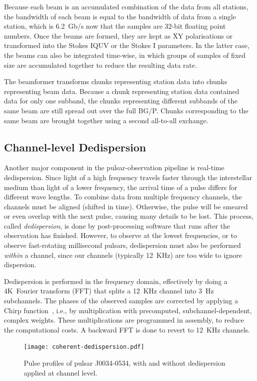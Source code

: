 \documentclass{llncs}
\begin{document}
Because each beam is an accumulated combination of the data from all stations, the bandwidth of each beam is equal to the bandwidth of data from a single station, which is 6.2~Gb/s now that the samples are 32-bit floating point numbers. Once the beams are formed, they are kept as XY polarisations or transformed into the Stokes IQUV or the Stokes I parameters. In the latter case, the beams can also be integrated time-wise, in which groups of samples of fixed size are accumulated together to reduce the resulting data rate.

The beamformer transforms chunks representing station data into chunks representing beam data. Because a chunk representing station data contained data for only one subband, the chunks representing different subbands of the same beam are still spread out over the full BG/P. Chunks corresponding to the same beam are brought together using a second all-to-all exchange.

\subsection{Channel-level Dedispersion}

Another major component in the pulsar-observation pipeline is real-time dedispersion.  Since light of a high frequency travels faster through the interstellar medium than light of a lower frequency, the arrival time of a pulse differs for different wave lengths. To combine data from multiple frequency channels, the channels must be aligned (shifted in time). Otherwise, the pulse will be smeared or even overlap with the next pulse, causing many details to be lost. This process, called \emph{dedispersion}, is done by post-processing software that runs after the observation has finished.  However, to observe at the lowest frequencies, or to observe fast-rotating millisecond pulsars, dedispersion must also be performed \emph{within\/} a channel, since our channels (typically 12~KHz) are too wide to ignore dispersion.

Dedispersion is performed in the frequency domain, effectively by doing a 4K~Fourier transform (FFT) that splits a 12~KHz channel into 3~Hz subchannels. The phases of the observed samples are corrected by applying a Chirp function~\cite{...}, i.e., by multiplication with precomputed, subchannel-dependent, complex weights. These multiplications are programmed in assembly, to reduce the computational costs. A backward FFT is done to revert to 12~KHz channels. 

\begin{figure}[ht]
\texttt{[image: coherent-dedispersion.pdf]}
\label{fig:dedispersion-result}
\caption{Pulse profiles of pulsar J0034-0534, with and without dedispersion applied at channel level.}
\end{figure}
\end{document}
